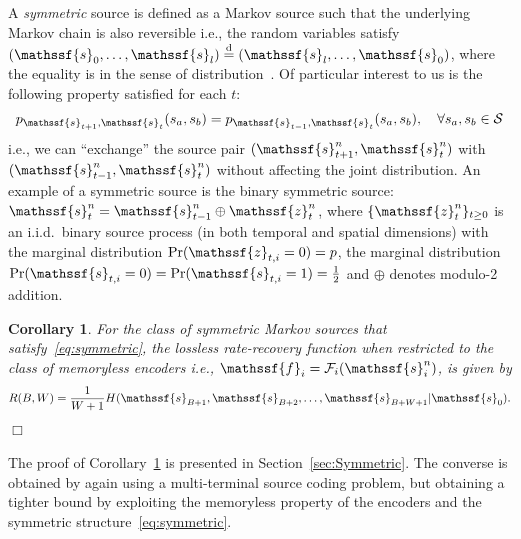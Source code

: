 \documentclass[journal, twocolumn, 10pt]{IEEEtran}
\newtheorem{remark}{Remark}
\newtheorem{corol}{Corollary}
\newcommand{\cF}{{\mathcal{F}}}
\newcommand{\cS}{{\mathcal{S}}}
\newcommand{\rvf}{{\mathssf{f}}}    %
\newcommand{\rvs}{{\mathssf{s}}}    %
\newcommand{\rvz}{{\mathssf{z}}}    %
\begin{document}
A {\em symmetric} source is defined as a Markov source such that the underlying Markov chain is also reversible i.e., the random variables  satisfy   $(\rvs_0,\ldots, \rvs_l) \stackrel{\text{d}}{=} (\rvs_l, \ldots, \rvs_0)$, where the equality is in the sense of distribution~\cite{markov}.  Of particular interest to us is the following property satisfied for each $t$:
\begin{align}
p_{\rvs_{t+1}, \rvs_{t}} (s_a, s_b) = p_{\rvs_{t-1},\rvs_t}(s_a, s_b), \quad \forall s_a, s_b \in \cS\label{eq:symmetric}
\end{align}
i.e., we can ``exchange'' the source pair $(\rvs_{t+1}^n,\rvs_t^n)$ with $(\rvs_{t-1}^n,\rvs_t^n)$ without affecting the joint distribution.  An example of a symmetric source is the binary symmetric source: $\rvs_t^n = \rvs_{t-1}^n \oplus \rvz_t^n$, where $\{\rvz_t^n\}_{t\ge 0}$ is  an i.i.d.\ binary source process (in both temporal and spatial  dimensions)  with the marginal distribution ${\Pr(\rvz_{t,i}=0)=p}$, the marginal distribution $\Pr(\rvs_{t,i}=0) = \Pr(\rvs_{t,i}=1) =\frac{1}{2}$ and $\oplus$ denotes modulo-2 addition. %
\begin{corol}
\label{thm:binning}
For the class of symmetric Markov sources that satisfy~\eqref{eq:symmetric}, the lossless rate-recovery function when restricted to the class of memoryless encoders i.e., $\rvf_i = \cF_i(\rvs_i^n)$, is given by
\begin{align}
R(B,W) = \frac{1}{W+1} H(\rvs_{B+1}, \rvs_{B+2}, \ldots, \rvs_{B+W+1}|\rvs_{0}).\label{eq:rate-rec-binning}
\end{align}
\hfill$\Box$
\end{corol}
The proof of Corollary~\ref{thm:binning} is presented in Section~\ref{sec:Symmetric}.  The converse is obtained by again using a multi-terminal source coding problem, %
but obtaining a tighter bound by exploiting the memoryless property of the encoders and the symmetric structure~\eqref{eq:symmetric}.



\end{document}
